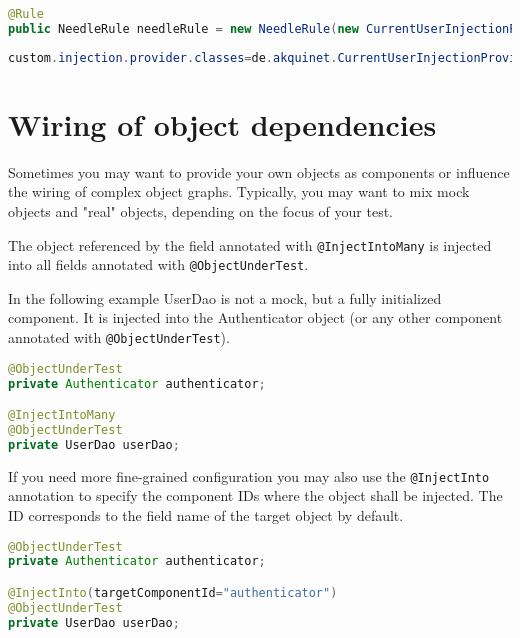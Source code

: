 \begin{lstlisting}[language={JAVA},caption=Custom injection provider for a specific test]
@Rule
public NeedleRule needleRule = new NeedleRule(new CurrentUserInjectionProvider());
\end{lstlisting}

\begin{lstlisting}[language={JAVA},caption=Global custom injection provider]
custom.injection.provider.classes=de.akquinet.CurrentUserInjectionProvider
\end{lstlisting}

\section{Wiring of object dependencies}
\label{sec:Wiring of object dependencies}

Sometimes you may want to provide your own objects as components or influence the wiring of complex object graphs. Typically, you may want to mix
mock objects and "real" objects, depending on the focus of your test.

The object referenced by the field annotated with \verb|@InjectIntoMany| is injected into all fields annotated with \verb|@ObjectUnderTest|.

In the following example UserDao is not a mock, but a fully initialized component. It is injected into the Authenticator object (or any other
component annotated with \verb|@ObjectUnderTest|). 

\begin{lstlisting}[language={JAVA},caption=InjectIntoMany]
@ObjectUnderTest
private Authenticator authenticator;

@InjectIntoMany
@ObjectUnderTest
private UserDao userDao;
\end{lstlisting}

If you need more fine-grained configuration you may also use the \verb|@InjectInto| annotation to specify the component IDs where the object 
shall be injected.
The ID corresponds to the field name of the target object by default.

\begin{lstlisting}[language={JAVA},caption=InjectInto]
@ObjectUnderTest
private Authenticator authenticator;

@InjectInto(targetComponentId="authenticator")
@ObjectUnderTest
private UserDao userDao;
\end{lstlisting}





